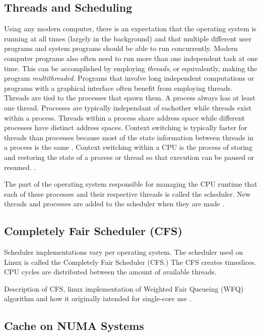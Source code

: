 \documentclass{sig-alternate}
\begin{document}
\subsection{Threads and Scheduling}
\label{sec:threads}
Using any modern computer, there is an expectation that the operating system is running at all times (largely in the background) and that multiple different user programs and system programs should be able to run concurrently. Modern computer programs also often need to run more than one independent task at one time. This can be accomplished by employing \emph{threads}, or equivalently, making the program \emph{multithreaded}. Programs that involve long independent computations or programs with a graphical interface often benefit from employing threads. Threads are tied to the processes that spawn them. A process always has at least one thread. Processes are typically independant of eachother while threads exist within a process. Threads within a process share address space while different processes have distinct address spaces. Context switching is typically faster for threads than processes because most of the state information between threads in a process is the same \cite{WikiThreads}. Context switching within a CPU is the process of storing and restoring the state of a process or thread so that execution can be paused or resumed. \cite{WikiContext}.

The part of the operating system responsible for managing the CPU runtime that each of these processes and their respective threads is called the scheduler. New threads and processes are added to the scheduler when they are made \cite{Lozi:2016}.

\subsection{Completely Fair Scheduler (CFS)}
\label{sec:cfs}

Scheduler implementations vary per operating system. The scheduler used on Linux is called the Completely Fair Scheduler (CFS.) The CFS creates timeslices. CPU cycles are distributed between the amount of available threads.

\cite{Lozi:2016}

Description of CFS, linux implementation of Weighted Fair Queueing (WFQ) algorithm and how it originally intended for single-core use \cite{Lozi:2016}.

\subsection{Cache on NUMA Systems}
\label{sec:cache}
\end{document}
